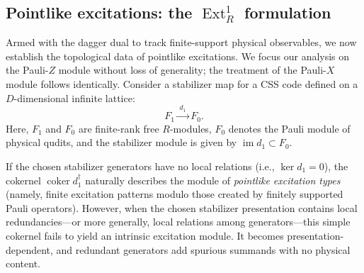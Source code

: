 \documentclass[aps,prx,english,superscriptaddress,twocolumn,tightenlines,showpacs,longbibliography,floatfix,amsfonts]{revtex4-2}
\theoremstyle{remark}
\theoremstyle{definition}
\begin{document}
\subsection{Pointlike excitations: the $\operatorname{Ext}_R^1$ formulation}
\label{subsec:pointlike-ext}

Armed with the dagger dual to track finite-support physical observables, we now establish the topological data of pointlike excitations. We focus our analysis on the Pauli-$Z$ module without loss of generality; the treatment of the Pauli-$X$ module follows identically. Consider a stabilizer map for a CSS code defined on a $D$-dimensional infinite lattice:
\begin{equation}
	F_1\xrightarrow{\;d_1\;}F_0.
	\label{eq:local-stabilizer-map}
\end{equation}
Here, $F_1$ and $F_0$ are finite-rank free $R$-modules, $F_0$ denotes the Pauli module of physical qudits, and the stabilizer module is given by $\operatorname{im} d_1 \subset F_0$.

If the chosen stabilizer generators have no local relations (i.e., $\ker d_1=0$), the cokernel $\operatorname{coker} d_1^\dagger$ naturally describes the module of \textit{pointlike excitation types} (namely, finite excitation patterns modulo those created by finitely supported Pauli operators). However, when the chosen stabilizer presentation contains local redundancies—or more generally, local relations among generators—this simple cokernel fails to yield an intrinsic excitation module. It becomes presentation-dependent, and redundant generators add spurious summands with no physical content.
\end{document}
